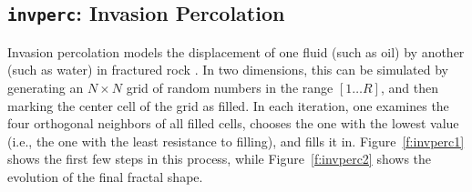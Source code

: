 \subsection{{\tt{invperc}}:
	Invasion Percolation
	\label{s:toys-invperc}}

Invasion percolation models the displacement of one fluid
(such as oil)
by another
(such as water)
in fractured rock \cite{b:percolation-theory}.
In two dimensions,
this can be simulated by generating
an $N{\times}N$ grid of random numbers in the range $[1{\ldots}R]$,
and then marking the center cell of the grid as filled.
In each iteration,
one examines the four orthogonal neighbors of all filled cells,
chooses the one with the lowest value
(i.e., the one with the least resistance to filling),
and fills it in.
Figure~\ref{f:invperc1} shows the first few steps in this process,
while Figure~\ref{f:invperc2} shows the evolution of the final fractal shape.

